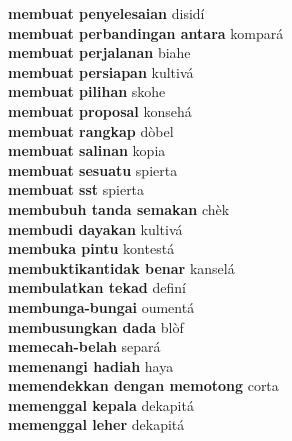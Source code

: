 \textbf{ membuat penyelesaian  } disidí \\
\textbf{ membuat perbandingan antara  } kompará \\
\textbf{ membuat perjalanan  } biahe \\
\textbf{ membuat persiapan  } kultivá \\
\textbf{ membuat pilihan  } skohe \\
\textbf{ membuat proposal  } konsehá \\
\textbf{ membuat rangkap  } dòbel \\
\textbf{ membuat salinan  } kopia \\
\textbf{ membuat sesuatu  } spierta \\
\textbf{ membuat sst  } spierta \\
\textbf{ membubuh tanda semakan  } chèk \\
\textbf{ membudi dayakan  } kultivá \\
\textbf{ membuka pintu  } kontestá \\
\textbf{ membuktikantidak benar  } kanselá \\
\textbf{ membulatkan tekad  } definí \\
\textbf{ membunga-bungai  } oumentá \\
\textbf{ membusungkan dada  } blòf \\
\textbf{ memecah-belah  } separá \\
\textbf{ memenangi hadiah  } haya \\
\textbf{ memendekkan dengan memotong  } corta \\
\textbf{ memenggal kepala  } dekapitá \\
\textbf{ memenggal leher  } dekapitá \\
